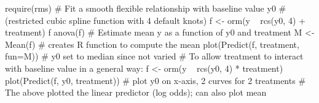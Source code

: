 \begin{Schunk}
\begin{Sinput}
require(rms)
# Fit a smooth flexible relationship with baseline value y0
# (restricted cubic spline function with 4 default knots)
f <- orm(y ~ rcs(y0, 4) + treatment)
f
anova(f)
# Estimate mean y as a function of y0 and treatment
M <- Mean(f)   # creates R function to compute the mean
plot(Predict(f, treatment, fun=M))  # y0 set to median since not varied
# To allow treatment to interact with baseline value in a general way:
f <- orm(y ~ rcs(y0, 4) * treatment)
plot(Predict(f, y0, treatment))  # plot y0 on x-axis, 2 curves for 2 treatments
# The above plotted the linear predictor (log odds); can also plot mean
\end{Sinput}
\end{Schunk}

